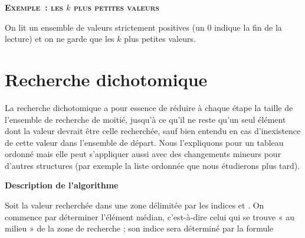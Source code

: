 	{\sffamily\bfseries\scshape
	Exemple~: les $k$ plus petites valeurs}

		On lit un ensemble de valeurs strictement positives (un 0 indique la fin
		de la lecture) et on ne garde que les $k$ plus petites valeurs.

		\bigskip
		
		

\section{Recherche dichotomique}

	La recherche dichotomique a pour essence de réduire à
	chaque étape la taille de l’ensemble de recherche de moitié, jusqu’à ce
	qu’il ne reste qu’un seul élément dont la valeur devrait être celle
	recherchée, sauf bien entendu en cas d’inexistence de cette valeur dans
	l’ensemble de départ. Nous l’expliquons pour un tableau ordonné mais
	elle peut s’appliquer aussi avec des changements mineurs pour
	d'autres structures (par exemple la liste ordonnée que
	nous étudierons plus tard).

	{\sffamily\bfseries\upshape
	Description de l’algorithme}

	Soit  la valeur recherchée dans une zone
	délimitée par les indices  et
	. On commence par déterminer l’élément
	médian, c’est-à-dire celui qui se trouve « au milieu » de la zone de
	recherche ; son indice sera déterminé par la formule

